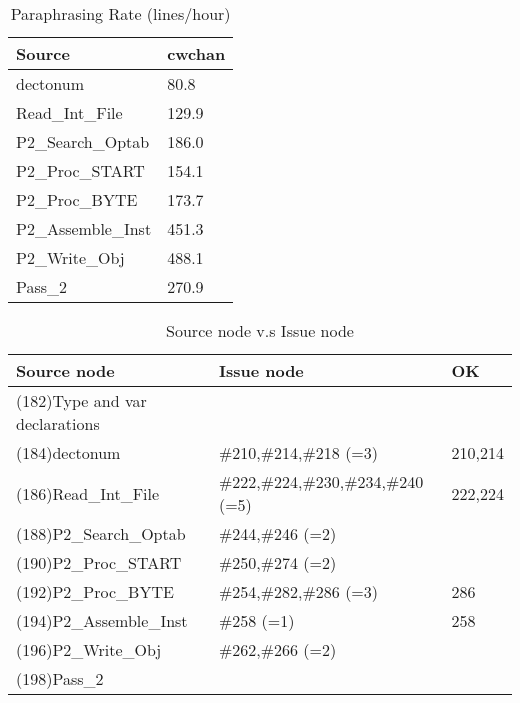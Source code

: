 \begin{table}[hb]
\begin{center}
\begin{tabular}{|l|l|}
\hline
Source & cwchan\\
\hline
dectonum & 80.8\\
Read\_Int\_File & 129.9\\
P2\_Search\_Optab & 186.0\\
P2\_Proc\_START & 154.1\\
P2\_Proc\_BYTE & 173.7\\
P2\_Assemble\_Inst & 451.3\\
P2\_Write\_Obj & 488.1\\
Pass\_2 & 270.9\\
\hline
\end{tabular}
\end{center}
\caption{Paraphrasing Rate (lines/hour)}
\end{table}


\begin{table}[hb]
\begin{center}
\begin{tabular}{|l|l|l|}
\hline
Source node & Issue node  & OK\\
\hline
(182)Type and var declarations &  & \\
(184)dectonum & \#210,\#214,\#218 (=3) & 210,214\\
(186)Read\_Int\_File & \#222,\#224,\#230,\#234,\#240 (=5) & 222,224\\
(188)P2\_Search\_Optab & \#244,\#246 (=2) & \\
(190)P2\_Proc\_START & \#250,\#274 (=2) & \\
(192)P2\_Proc\_BYTE & \#254,\#282,\#286 (=3) & 286\\
(194)P2\_Assemble\_Inst & \#258 (=1) & 258\\
(196)P2\_Write\_Obj & \#262,\#266 (=2) & \\
(198)Pass\_2 &  & \\
\hline
\end{tabular}
\caption{Source node v.s Issue node}
\end{center}
\end{table}

